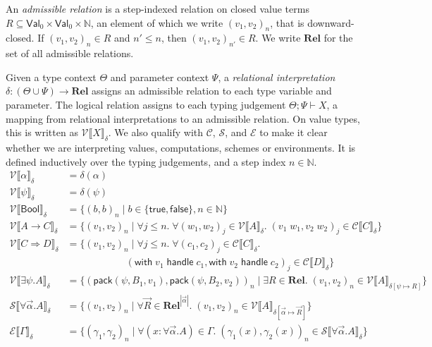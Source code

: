\documentclass[acmsmall,screen,review,anonymous]{acmart}
\newcommand{\tbool}{\mathsf{Bool}}
\newcommand{\tfun}[2]{#1 \to #2}
\newcommand{\thandler}[2]{#1 \Rightarrow #2}
\newcommand{\with}{\mathsf{with}\;}
\newcommand{\handle}{\;\mathsf{handle}\;}
\newcommand{\ttrue}{\mathsf{true}}
\newcommand{\ffalse}{\mathsf{false}}
\newcommand{\pack}{\mathsf{pack}}
\newcommand{\G}{\Gamma}
\newcommand{\tj}[3]{#1; #2 \vdash #3}
\newcommand{\Rel}{\mathbf{Rel}}
\newcommand{\VV}{\mathcal{V}}
\newcommand{\SSS}{\mathcal{S}}
\newcommand{\CC}{\mathcal{C}}
\newcommand{\GG}{\mathcal{E}}
\begin{document}
\begin{definition}
  An \emph{admissible relation} is a step-indexed relation on closed value terms
  $R \subseteq \mathsf{Val}_0 \times \mathsf{Val}_0 \times \mathbb{N}$, an element of which we write $(v_1, v_2)_n$,
  that is downward-closed. If $(v_1, v_2)_n \in R$ and $n' \leq n$, then $(v_1, v_2)_{n'} \in R$.
  We write $\Rel$ for the set of all admissible relations.
\end{definition}

Given a type context $\Theta$ and parameter context $\Psi$,
a \emph{relational interpretation} $\delta : (\Theta \cup \Psi) \to \Rel$ assigns an admissible relation to each type variable and parameter.
The logical relation assigns to each typing judgement $\tj \Theta \Psi X$, a mapping from relational interpretations to an admissible relation.
On value types, this is written as $\VV\llbracket X \rrbracket_\delta$.
We also qualify with $\CC$, $\SSS$, and $\GG$ to make it clear whether we are interpreting values, computations, schemes or environments.
It is defined inductively over the typing judgements, and a step index $n\in\mathbb{N}$.
\begin{align*}
  \VV\llbracket \alpha \rrbracket_\delta &= \delta(\alpha) \\
  \VV\llbracket \psi \rrbracket_\delta &= \delta(\psi) \\
  \VV\llbracket \tbool \rrbracket_\delta &= \{(b, b)_n \mid b \in \{\ttrue, \ffalse\}, n \in \mathbb{N}\} \\
  \VV\llbracket \tfun{A}{C} \rrbracket_\delta &= \{(v_1, v_2)_n \mid \forall j \leq n.\; \forall (w_1, w_2)_j \in \VV\llbracket A \rrbracket_\delta.\; (v_1\;w_1, v_2\;w_2)_j \in \CC\llbracket C \rrbracket_\delta\} \\
  \VV\llbracket \thandler{C}{D} \rrbracket_\delta &= \{(v_1, v_2)_n \mid \forall j \leq n.\; \forall (c_1, c_2)_j \in \CC\llbracket C \rrbracket_\delta. \\
  &\qquad\qquad\qquad (\with v_1 \handle c_1, \with v_2 \handle c_2)_j \in \CC\llbracket D \rrbracket_\delta\} \\
  \VV\llbracket \exists\psi.A \rrbracket_\delta &= \{(\pack(\psi, B_1, v_1), \pack(\psi, B_2, v_2))_n \mid \exists R \in \Rel.\; (v_1, v_2)_n \in \VV\llbracket A \rrbracket_{\delta[\psi \mapsto R]}\} \\
  \SSS\llbracket \forall\vec\alpha.A \rrbracket_\delta &= \{(v_1, v_2)_n \mid \forall \vec{R} \in \Rel^{|\vec\alpha|}.\; (v_1, v_2)_n \in \VV\llbracket A \rrbracket_{\delta[\vec\alpha \mapsto \vec{R}]}\} \\
  \GG\llbracket \G \rrbracket_\delta &= \{(\gamma_1, \gamma_2)_n \mid \forall(x:\forall\vec\alpha.A)\in\Gamma. \; (\gamma_1(x), \gamma_2(x))_n \in\SSS\llbracket \forall\vec\alpha.A \rrbracket_\delta \}
\end{align*}
\end{document}
